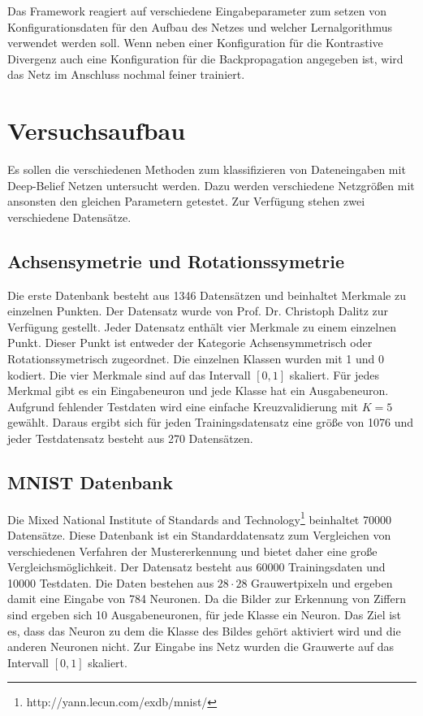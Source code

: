 \documentclass[12pt]{article}
\begin{document}
Das Framework reagiert auf verschiedene Eingabeparameter zum setzen von Konfigurationsdaten für den Aufbau des Netzes und welcher Lernalgorithmus verwendet werden soll. Wenn neben einer Konfiguration für die Kontrastive Divergenz auch eine Konfiguration für die Backpropagation angegeben ist, wird das Netz im Anschluss nochmal feiner trainiert.

\section{Versuchsaufbau}
Es sollen die verschiedenen Methoden zum klassifizieren von Dateneingaben mit Deep-Belief Netzen untersucht werden. Dazu werden verschiedene Netzgrößen mit ansonsten den gleichen Parametern getestet. Zur Verfügung stehen zwei verschiedene Datensätze.
\subsection{Achsensymetrie und Rotationssymetrie}
Die erste Datenbank besteht aus 1346 Datensätzen und beinhaltet Merkmale zu einzelnen Punkten. Der Datensatz wurde von  Prof. Dr. Christoph Dalitz zur Verfügung gestellt. Jeder Datensatz enthält vier Merkmale zu einem einzelnen Punkt. Dieser Punkt ist entweder der Kategorie Achsensymmetrisch oder Rotationssymetrisch zugeordnet. Die einzelnen Klassen wurden mit 1 und 0 kodiert. Die vier Merkmale sind auf das Intervall $[0,1]$ skaliert. Für jedes Merkmal gibt es ein Eingabeneuron und jede Klasse hat ein Ausgabeneuron. Aufgrund fehlender Testdaten wird eine einfache Kreuzvalidierung mit $K=5$ gewählt.  Daraus ergibt sich für jeden Trainingsdatensatz eine größe von 1076 und jeder Testdatensatz besteht aus 270 Datensätzen.

\subsection{MNIST Datenbank}
Die Mixed National Institute of Standards and Technology\footnote{http://yann.lecun.com/exdb/mnist/} beinhaltet 70000 Datensätze. Diese Datenbank ist ein Standarddatensatz zum Vergleichen von verschiedenen Verfahren der Mustererkennung und bietet daher eine große Vergleichsmöglichkeit. Der Datensatz besteht aus 60000 Trainingsdaten und 10000 Testdaten. Die Daten bestehen aus $28 \cdot 28$ Grauwertpixeln und ergeben damit eine Eingabe von 784 Neuronen. Da die Bilder zur Erkennung von Ziffern sind ergeben sich 10 Ausgabeneuronen, für jede Klasse ein Neuron. Das Ziel ist es, dass das Neuron zu dem die Klasse des Bildes gehört aktiviert wird und die anderen Neuronen nicht. Zur Eingabe ins Netz wurden die Grauwerte auf das Intervall $[0,1]$ skaliert.
\end{document}
